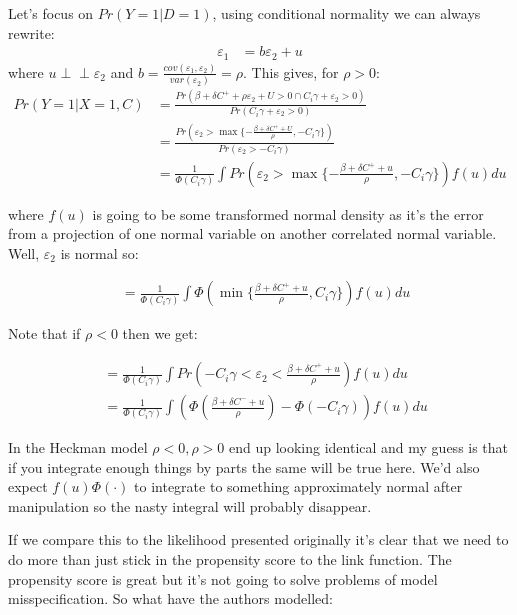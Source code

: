 \documentclass{article}
\newcommand{\indep}{\perp \!\!\! \perp}
\begin{document}
Let's focus on $Pr( Y = 1 | D = 1)$, using conditional normality we can always rewrite:
\begin{align*}
    \varepsilon_1 &= b\varepsilon_2 + u
\end{align*}
where $u \indep \varepsilon_2$ and $b = \frac{cov(\varepsilon_1, \varepsilon_2)}{var(\varepsilon_2)} = \rho$. 
This gives, for $\rho > 0$:
\begin{align*}
    Pr(Y = 1 | X = 1, C) &= \frac{Pr(\beta + \delta C^+ + \rho \varepsilon_2 + U > 0 \cap C_i \gamma + \varepsilon_2  > 0)}{
    Pr(C_i \gamma + \varepsilon_2 > 0)} \\
    &= \frac{Pr(\varepsilon_2 > \max \{ - \frac{\beta + \delta C^+ + U}{\rho}, -C_i \gamma\})}{
        Pr(\varepsilon_2 > -C_i \gamma)
    } \\
    &= \frac{1}{\Phi(C_i \gamma)} \int
    Pr(\varepsilon_2 > \max \{ - \frac{\beta + \delta C^+ + u}{\rho}, -C_i \gamma\}) f(u) du
\end{align*}


where $f(u)$ is going to be some transformed normal density as it's the error from a projection 
of one normal variable on another correlated normal variable. Well, $\varepsilon_2$ is 
normal so:

\begin{align*}
    &= \frac{1}{\Phi(C_i \gamma)} \int
    \Phi\left( \min \{  \frac{\beta + \delta C^+ + u}{\rho}, C_i \gamma\}\right) f(u) du
\end{align*}


Note that if $\rho < 0$ then we get:

\begin{align*}
    &= \frac{1}{\Phi(C_i \gamma)} \int
    Pr(-C_i \gamma < \varepsilon_2 <  \frac{\beta + \delta C^+ + u}{\rho}) f(u) du \\
    &= \frac{1}{\Phi(C_i \gamma)} \int \left(
    \Phi\left(\frac{\beta + \delta C^- + u}{\rho}\right) - \Phi(-C_i \gamma)\right) f(u) du 
\end{align*}

In the Heckman model $\rho < 0, \rho > 0$ end up looking identical and my guess is 
that if you integrate enough things by parts the same will be true here. We'd also 
expect $f(u) \Phi(\cdot)$ to integrate to something approximately normal after 
manipulation so the nasty integral will probably disappear.

If we compare this to the likelihood presented originally it's clear that we need 
to do more than just stick in the propensity score to the link function. The 
propensity score is great but it's not going to solve 
problems of model misspecification. So what have the authors modelled:
\end{document}
